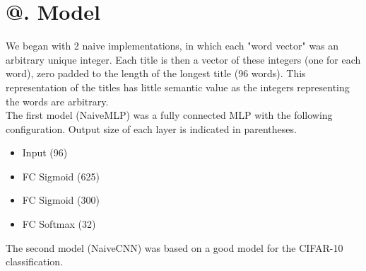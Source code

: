 \documentclass[jou,apacite, 10px]{apa6}
\makeatletter
\newcommand*{\rom}[1]{\expandafter\@slowromancap\romannumeral #1@}
\makeatother
\begin{document}
\section{\rom{4}. Model}
We began with 2 naive implementations, in which each "word vector" was an arbitrary unique integer. Each title is then a vector of these integers (one for each word), zero padded to the length of the longest title (96 words). This representation of the titles has little semantic value as the integers representing the words are arbitrary.\\
The first model (NaiveMLP) was a fully connected MLP with the following configuration. Output size of each layer is indicated in parentheses.

\begin{itemize}
    \item Input (96)
    \item FC Sigmoid (625)
    \item FC Sigmoid (300)
    \item FC Softmax (32)
\end{itemize}\rule{0pt}{4ex}
The second model (NaiveCNN) was based on a good model for the CIFAR-10 classification.
\end{document}
